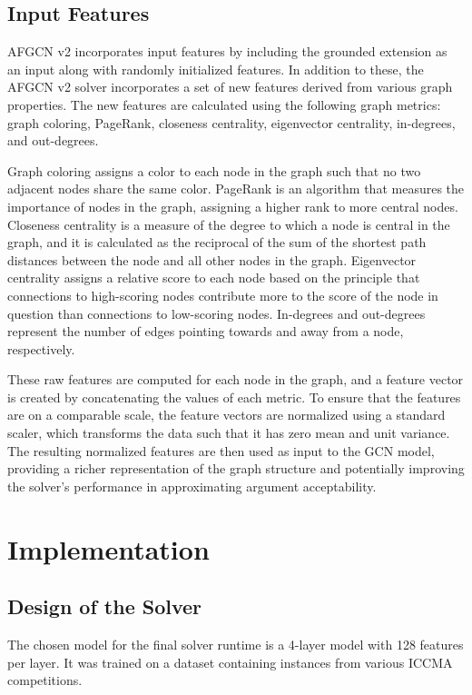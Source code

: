 \documentclass[conference]{IEEEtran}
\begin{document}
\subsection{Input Features}
AFGCN v2 incorporates input features by including the grounded extension as an input along with randomly initialized features. In addition to these, the AFGCN v2 solver incorporates a set of new features derived from various graph properties. The new features are calculated using the following graph metrics: graph coloring, PageRank, closeness centrality, eigenvector centrality, in-degrees, and out-degrees.

Graph coloring assigns a color to each node in the graph such that no two adjacent nodes share the same color. PageRank is an algorithm that measures the importance of nodes in the graph, assigning a higher rank to more central nodes. Closeness centrality is a measure of the degree to which a node is central in the graph, and it is calculated as the reciprocal of the sum of the shortest path distances between the node and all other nodes in the graph. Eigenvector centrality assigns a relative score to each node based on the principle that connections to high-scoring nodes contribute more to the score of the node in question than connections to low-scoring nodes. In-degrees and out-degrees represent the number of edges pointing towards and away from a node, respectively.

These raw features are computed for each node in the graph, and a feature vector is created by concatenating the values of each metric. To ensure that the features are on a comparable scale, the feature vectors are normalized using a standard scaler, which transforms the data such that it has zero mean and unit variance. The resulting normalized features are then used as input to the GCN model, providing a richer representation of the graph structure and potentially improving the solver's performance in approximating argument acceptability.

\section{Implementation}
\subsection{Design of the Solver}
The chosen model for the final solver runtime is a 4-layer model with 128 features per layer. It was trained on a dataset containing instances from various ICCMA competitions.
\end{document}
